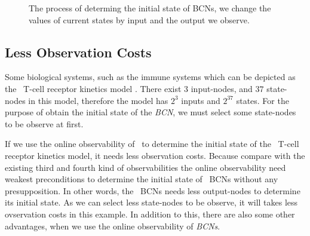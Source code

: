 \begin{figure}[thpb]
      \centering
      
      \caption{The process of determing the initial state of BCNs, we change the values of current states by input and the output we observe. }
      \label{fig:5}
   \end{figure}
\subsection{Less Observation Costs}
Some biological systems, such as the immune systems which can be depicted as the \BCN\ T-cell receptor kinetics model \cite{Klamt2006A}. There exist $3$ input-nodes, and $37$ state-nodes in this model, therefore the model has $2^3$ inputs and $2^{37}$ states. For the purpose of obtain the initial state of the {\em BCN}, we must select some state-nodes to be observe at first. 

If we use the online observability of \BCNs\ to determine the initial state of the \BCN\ T-cell receptor kinetics model, it needs less observation costs. Because compare with the existing third and fourth kind of observabilities the online observability need weakest preconditions to determine the initial state of {\ BCNs} without any presupposition. In other words, the {\ BCNs} needs less output-nodes to determine its initial state. As we can select less state-nodes to be observe, it will takes less ovservation costs in this example. In addition to this, there are also some other advantages, when we use the online observability of {\em BCNs}.

